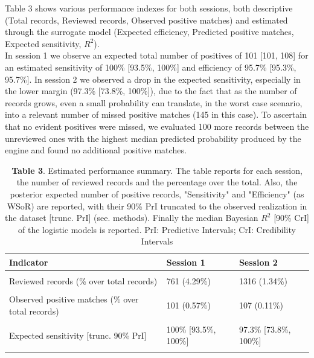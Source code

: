 \documentclass{article}
\begin{document}
Table 3 shows various performance indexes for both sessions, both
descriptive (Total records, Reviewed records, Observed positive matches)
and estimated through the surrogate model (Expected efficiency,
Predicted positive matches, Expected sensitivity, \(R^2\)).\\
In session 1 we observe an expected total number of positives of 101
{[}101, 108{]} for an estimated sensitivity of 100\% {[}93.5\%, 100\%{]}
and efficiency of 95.7\% {[}95.3\%, 95.7\%{]}. In session 2 we observed
a drop in the expected sensitivity, especially in the lower margin
(97.3\% {[}73.8\%, 100\%{]}), due to the fact that as the number of
records grows, even a small probability can translate, in the worst case
scenario, into a relevant number of missed positive matches (145 in this
case). To ascertain that no evident positives were missed, we evaluated
100 more records between the unreviewed ones with the highest median
predicted probability produced by the engine and found no additional
positive matches.

\begin{table}[!h]

\caption{\label{tab:Table 3}\textbf{Table 3}. Estimated performance summary. The table reports for each session, the number of reviewed records and the percentage over the total. Also, the posterior expected number of positive records, "Sensitivity" and "Efficiency" (as WSoR) are reported, with their 90\% PrI truncated to the observed realization in the dataset [trunc. PrI] (see. methods). Finally the median Bayesian $R^2$ [90\% CrI] of the logistic models is reported. PrI: Predictive Intervals; CrI: Credibility Intervals}
\centering
\begin{tabular}[t]{lll}
\toprule
Indicator & Session 1 & Session 2\\
\midrule
\cellcolor{gray!6}{Total records} & \cellcolor{gray!6}{17755} & \cellcolor{gray!6}{98371}\\
Reviewed records (\% over total records) & 761 (4.29\%) & 1316 (1.34\%)\\
\cellcolor{gray!6}{Expected efficiency (over random) [trunc. 90\% PrI]} & \cellcolor{gray!6}{95.7\% [95.3\%, 95.7\%]} & \cellcolor{gray!6}{98.6\% [98.2\%, 98.7\%]}\\
Observed positive matches (\% over total records) & 101 (0.57\%) & 107 (0.11\%)\\
\cellcolor{gray!6}{Predicted positive matches [trunc. 90\% PrI]} & \cellcolor{gray!6}{101 [101, 108]} & \cellcolor{gray!6}{110 [107, 145]}\\
\addlinespace
Expected sensitivity [trunc. 90\% PrI] & 100\% [93.5\%, 100\%] & 97.3\% [73.8\%, 100\%]\\
\cellcolor{gray!6}{Simple Model $R^2$ [90\% CrI]} & \cellcolor{gray!6}{98.1\% [97.4\%, 98.3\%]} & \cellcolor{gray!6}{98.2\% [97.6\%, 98.3\%]}\\
\bottomrule
\end{tabular}
\end{table}
\end{document}
